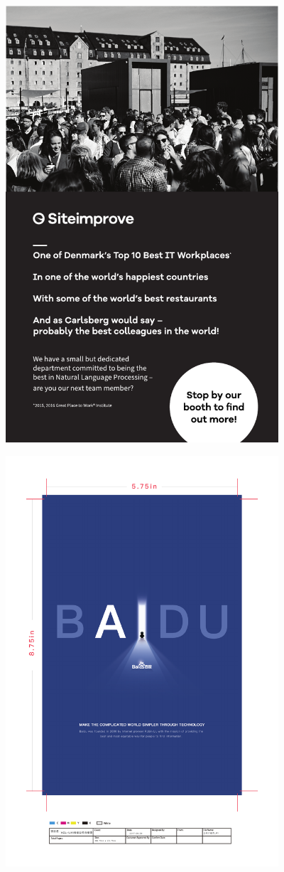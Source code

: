 \thispagestyle{empty}
\begin{center}
  \vfill
  \includegraphics[width=4in]{content/ads/platinum/siteimprove.pdf}
  \vfill
\end{center}
\clearpage

\thispagestyle{empty}
\begin{center}
  \vfill
  \includegraphics[width=4in]{content/ads/platinum/baidu.pdf}
  \vfill
\end{center}
\clearpage

